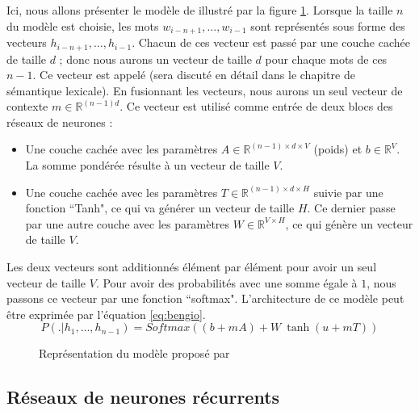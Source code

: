 \documentclass{KodeBook}
\begin{document}
Ici, nous allons présenter le modèle de \citet{2003-bengio-al} illustré par la figure \ref{fig:bengio-l}.
Lorsque la taille $n$ du modèle est choisie, les mots $w_{i-n+1}, \ldots, w_{i-1}$ sont représentés sous forme des vecteurs  $h_{i-n+1}, \ldots, h_{i-1}$. 
Chacun de ces vecteur est passé par une couche cachée de taille $d$ ; donc nous aurons un vecteur de taille $d$ pour chaque mots de ces $n-1$.
Ce vecteur est appelé  (sera discuté en détail dans le chapitre de sémantique lexicale). 
En fusionnant les vecteurs, nous aurons un seul vecteur de contexte $m \in \mathbb{R}^{(n-1) d}$.
Ce vecteur est utilisé comme entrée de deux blocs des réseaux de neurones :
\begin{itemize}
	\item Une couche cachée avec les paramètres $A \in \mathbb{R}^{(n-1) \times d \times V}$ (poids) et $b \in \mathbb{R}^{V}$. 
	La somme pondérée résulte à un vecteur de taille $V$. 
	\item Une couche cachée avec les paramètres $T \in \mathbb{R}^{(n-1) \times d \times H}$ suivie par une fonction ``Tanh", ce qui va générer un vecteur de taille $H$. 
	Ce dernier passe par une autre couche avec les paramètres $W \in \mathbb{R}^{V \times H}$, ce qui génère un vecteur de taille $V$. 
\end{itemize}
Les deux vecteurs sont additionnés élément par élément pour avoir un seul vecteur de taille $V$. 
Pour avoir des probabilités avec une somme égale à $1$, nous passons ce vecteur par une fonction ``softmax". 
L'architecture de ce modèle peut être exprimée par l'équation \ref{eq:bengio}.
\begin{equation}
	P(.|h_1,\ldots, h_{n-1}) = 
	Softmax \left(
	(b + m A) 
	+ 
	W\ \tanh(u + m T)
	\right)
	\label{eq:bengio}
\end{equation}

\begin{figure}[ht]
	\centering
	\caption[Modèle de langage à base des réseaux de neurones à propagation avant]{Représentation du modèle proposé par \citet{2003-bengio-al}\label{fig:bengio-l}}
\end{figure}

\subsection{Réseaux de neurones récurrents}
\end{document}
